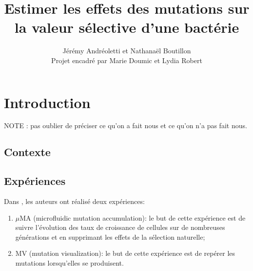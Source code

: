 \documentclass[12pt]{article}
\title{Estimer les effets des mutations sur la valeur sélective d'une bactérie}
\author{Jérémy Andréoletti et Nathanaël Boutillon\\Projet encadré par Marie Doumic et Lydia Robert}
\newcounter{prop}[section]
\begin{document}
\maketitle

%
%
%
%
%

\tableofcontents

\newpage

\section{Introduction}

NOTE : pas oublier de préciser ce qu'on a fait nous et ce qu'on n'a pas fait nous.

\subsection{Contexte}

\subsection{Expériences}

Dans \cite{rob}, les auteurs ont réalisé deux expériences: 
\begin{enumerate}
\item $\mu$MA (microfluidic mutation accumulation): le but de cette expérience est de suivre l'évolution des taux de croissance de cellules sur de nombreuses générations et en supprimant les effets de la sélection naturelle;
\item MV (mutation visualization): le but de cette expérience est de repérer les mutations lorsqu'elles se produisent.
\end{enumerate}
\end{document}
